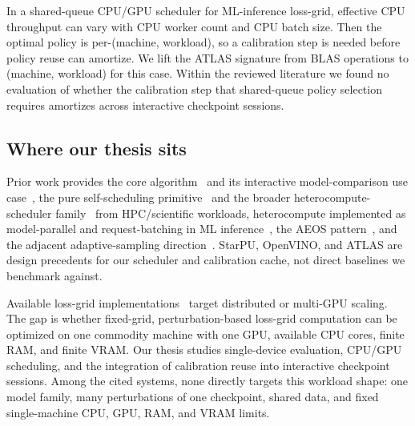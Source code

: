 In a shared-queue CPU/GPU scheduler for ML-inference
loss-grid, effective CPU throughput can vary with CPU worker
count and CPU batch size. Then the optimal policy is
per-(machine, workload), so a calibration step is needed
before policy reuse can amortize. We lift the ATLAS signature
from BLAS operations to (machine, workload) for this case.
Within the reviewed literature we found no evaluation of
whether the calibration step that shared-queue policy
selection requires amortizes across interactive checkpoint
sessions.

\subsection{Where our thesis sits}\label{rw-placement}

Prior work provides the core
algorithm~\cite{li2018losslandscape,goldstein_loss_landscape_repo}
and its interactive model-comparison use
case~\cite{xie2025losslens,losslens_repo}, the pure
self-scheduling
primitive~\cite{kruskal1985selfscheduling} and the broader
heterocompute-scheduler family~\cite{augonnet2011starpu}
from HPC/scientific workloads, heterocompute implemented as model-parallel and
request-batching in ML
inference~\cite{openvino_hetero,openvino_auto_batching},
the AEOS pattern~\cite{whaley1998atlas}, and the adjacent
adaptive-sampling direction~\cite{prakash2024adaptive}.
StarPU, OpenVINO, and ATLAS are design precedents for our
scheduler and calibration cache, not direct baselines we
benchmark against.

Available loss-grid
implementations~\cite{goldstein_loss_landscape_repo,xie2025losslens}
target distributed or multi-GPU scaling. The gap
is whether fixed-grid, perturbation-based loss-grid
computation can be optimized on one commodity machine with
one GPU, available CPU cores, finite RAM, and finite VRAM.
Our thesis studies single-device
evaluation, CPU/GPU scheduling, and the integration of
calibration reuse into interactive checkpoint sessions. Among
the cited systems, none directly targets this workload shape:
one model family, many perturbations of one checkpoint, shared
data, and fixed single-machine CPU, GPU, RAM, and VRAM limits.
